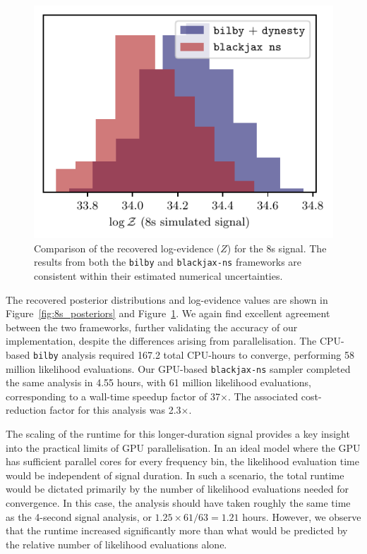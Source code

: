 \documentclass[fleqn,usenatbib]{mnras}
\begin{document}
\begin{figure}
    \centering
    \includegraphics{figures/8s_logZ_comparison.pdf}
    \caption{Comparison of the recovered log-evidence ($Z$) for the 8s
    signal. The results from both the \texttt{bilby} and
    \texttt{blackjax-ns} frameworks are consistent within their
    estimated numerical uncertainties.}
    \label{fig:8s_logZ}
\end{figure}

The recovered posterior distributions and log-evidence values are shown
in Figure~\ref{fig:8s_posteriors} and Figure~\ref{fig:8s_logZ}. We again
find excellent agreement between the two frameworks, further validating
the accuracy of our implementation, despite the differences arising from 
parallelisation. The CPU-based \texttt{bilby} analysis required 167.2 total CPU-hours to
converge, performing 58 million likelihood evaluations. Our GPU-based
\texttt{blackjax-ns} sampler completed the same analysis in 4.55 hours, with 61 million likelihood evaluations,
corresponding to a wall-time speedup factor of 37$\times$. 
The associated cost-reduction factor for this
analysis was 2.3$\times$. 

The scaling of the runtime for this longer-duration signal provides a
key insight into the practical limits of GPU parallelisation. In an
ideal model where the GPU has sufficient parallel cores for every
frequency bin, the likelihood evaluation time would be independent of
signal duration. In such a scenario, the total runtime would be dictated
primarily by the number of likelihood evaluations needed for convergence.
In this case, the analysis should have taken roughly the same
time as the 4-second signal analysis, or $1.25 \times 61/63 = 1.21$ hours. 
However, we observe that the runtime increased significantly more than
what would be predicted by the relative number of likelihood evaluations alone.
\end{document}
